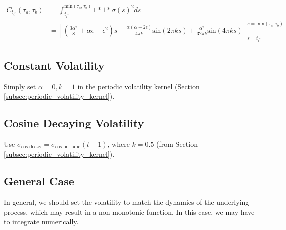 \begin{align}
    C_{t_{i^*}}(\tau_a, \tau_b) &= \int_{t_{i^*}}^{\text{min}(\tau_a, \tau_b)}1 * 1 * \sigma(s)^2ds \\
    &= \left[\left(\frac{3\alpha^2}{8} + \alpha\epsilon + \epsilon^2\right)s - \frac{\alpha(\alpha + 2\epsilon)}{4\pi k}\text{sin}(2\pi k s) + \frac{\alpha^2}{32\pi k}\text{sin}(4\pi k s)\right]_{s = t_{i^*}}^{s = \text{min}(\tau_a, \tau_b)}
\end{align}

\subsection{Constant Volatility}
Simply set $\alpha=0, k=1$ in the periodic volatility kernel (Section \ref{subsec:periodic_volatility_kernel}).

\subsection{Cosine Decaying Volatility}\label{subsec:cosine_decay_volatility}
Use $\sigma_\text{cos decay} = \sigma_\text{cos periodic}(t - 1)$, where $k = 0.5$ (from Section \ref{subsec:periodic_volatility_kernel}).

\subsection{General Case}

In general, we should set the volatility to match the dynamics of the underlying process, which may result in a non-monotonic function. In this case, we may have to integrate numerically.
